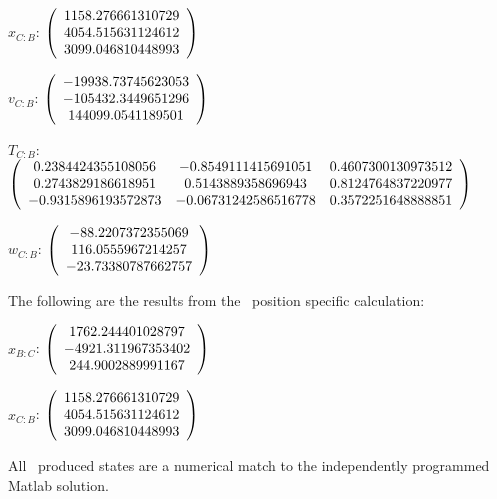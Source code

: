 \begin{description}
$x_{C:B}$: $\left( \begin{array} {ccc} 1158.276661310729 \\     4054.515631124612 \\     3099.046810448993
\end{array} \right)\\ \\$

$v_{C:B}$:  $\left( \begin{array} {ccc} -19938.73745623053 \\    -105432.3449651296 \\     144099.0541189501
\end{array} \right)\\ \\$

$T_{C:B}$: $\left( \begin{array} {ccc}
0.2384424355108056 &   -0.8549111415691051 &    0.4607300130973512 \\
 0.2743829186618951 &    0.5143889358696943 &    0.8124764837220977 \\
  -0.9315896193572873 &  -0.06731242586516778 &    0.3572251648888851 \\
\end{array} \right)\\ \\$

$w_{C:B}$:  $\left( \begin{array} {ccc}  -88.2207372355069 \\     116.0555967214257 \\    -23.73380787662757
\end{array} \right)\\ \\$


The following are the results from the \ position specific calculation:

$x_{B:C}$: $\left( \begin{array} {ccc}  1762.244401028797 \\    -4921.311967353402 \\     244.9002889991167
\end{array} \right)\\ \\$

$x_{C:B}$: $\left( \begin{array} {ccc} 1158.276661310729 \\     4054.515631124612 \\     3099.046810448993
\end{array} \right)\\ \\$

All \ produced states are a numerical match to the independently programmed Matlab solution.

\end{description}

